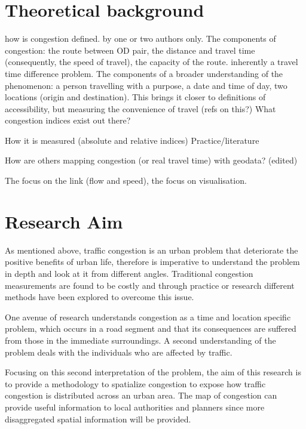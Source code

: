 \documentclass[a4paper]{jpconf}
\begin{document}
\section{Theoretical background}
how is congestion defined. by one or two authors only.
The components of congestion: the route between OD pair, the distance and travel time (consequently, the speed of travel), the capacity of the route. inherently a travel time difference problem.
The components of a broader understanding of the phenomenon: a person travelling with a purpose, a date and time of day, two locations (origin and destination). This brings it closer to definitions of accessibility, but measuring the convenience of travel (refs on this?)
\indent What congestion indices exist out there? \par
How it is measured (absolute and relative indices)
\indent Practice/literature\par
\indent How are others mapping congestion (or real travel time) with geodata? (edited) \par
The focus on the link (flow and speed), the focus on visualisation.

\section{Research Aim}
\indent As mentioned above, traffic congestion is an urban problem that deteriorate the positive benefits of urban life, therefore is imperative to understand the problem in depth and look at it from different angles. Traditional congestion measurements are found to be costly and through practice or research different methods have been explored to overcome this issue. \par
\indent One avenue of research understands congestion as a time and location specific problem, which occurs in a road segment and that its consequences are suffered from those in the immediate surroundings. A second understanding of the problem deals with the individuals who are affected by traffic. \par
\indent Focusing on this second interpretation of the problem, the aim of this research is to provide a methodology to spatialize congestion to expose how traffic congestion is distributed across an urban area. The map of congestion can provide useful information to local authorities and planners since more disaggregated spatial information will be provided. \par
\end{document}
